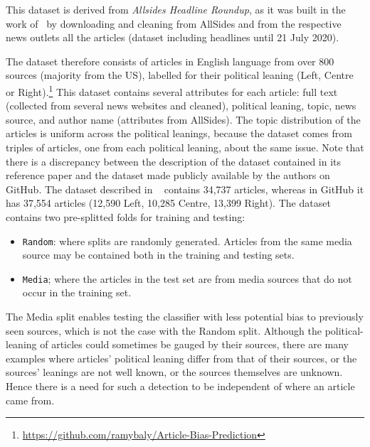This dataset is derived from \emph{Allsides Headline Roundup\texttrademark}, as it was built in the work of~\citet{baly2020we} by downloading and cleaning from AllSides and from the respective news outlets all the articles (dataset including headlines until 21 July 2020).

The dataset therefore 
consists of articles in English language from over 800 sources (majority from the US), labelled for their political leaning (Left, Centre or Right).\footnote{\url{https://github.com/ramybaly/Article-Bias-Prediction}}
This dataset contains several attributes for each article: full text (collected from several news websites and cleaned), political leaning, topic, news source, and author name (attributes from AllSides).
The topic distribution of the articles is uniform across the political leanings, because the dataset comes from triples of articles, one from each political leaning, about the same issue. 
Note that there is a discrepancy between the description of the dataset contained in its reference paper and the dataset made publicly available by the authors on GitHub.
The dataset described in ~\citet{baly2020we} contains 34,737 articles, whereas in GitHub it has 37,554 articles (12,590 Left, 10,285 Centre, 13,399 Right).
The dataset contains two pre-splitted folds for training and testing:
\begin{itemize}
    \item \texttt{Random}: where splits are randomly generated. Articles from the same media source may be contained both in the training and testing sets. 
    \item \texttt{Media}; where the articles in the test set are from media sources that do not occur in the training set. %
\end{itemize}

The Media split enables testing the classifier with less potential bias to previously seen sources, which is not the case with the Random split. Although the political-leaning of articles could sometimes be gauged by their sources, there are many examples where articles' political leaning differ from that of their sources, or the sources' leanings are not well known, or the sources themselves are unknown. Hence there is a need for such a detection to be independent of where an article came from.      


